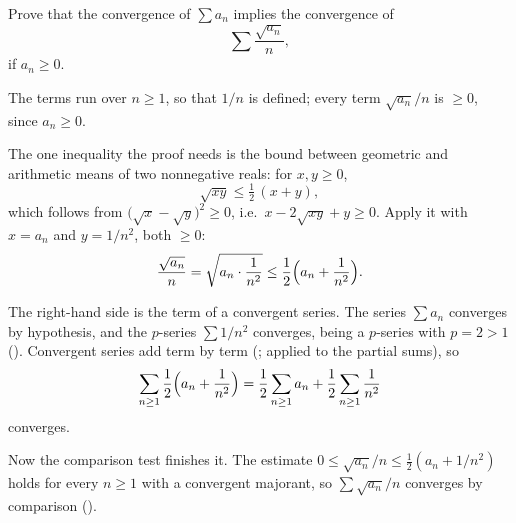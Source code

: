 \documentclass[main.tex]{subfiles}
\begin{document}
Prove that the convergence of $\sum a_{n}$ implies the convergence of
\[
\sum \frac{\sqrt{a_{n}}}{n},
\]
if $a_{n} \geq 0$.

\begin{SolutionBlue}
The terms run over $n\ge 1$, so that $1/n$ is defined; every term $\sqrt{a_n}/n$ is $\ge 0$, since
$a_n\ge 0$.

The one inequality the proof needs is the bound between geometric and arithmetic means of two
nonnegative reals: for $x,y\ge 0$,
\[
\sqrt{xy}\le\tfrac12\,(x+y),
\]
which follows from $\bigl(\sqrt{x}-\sqrt{y}\bigr)^2\ge 0$, i.e.\ $x-2\sqrt{xy}+y\ge 0$. Apply it with
$x=a_n$ and $y=1/n^2$, both $\ge 0$:
\[
\frac{\sqrt{a_n}}{n}=\sqrt{a_n\cdot\frac{1}{n^2}}\le\frac12\Bigl(a_n+\frac{1}{n^2}\Bigr).
\]

The right-hand side is the term of a convergent series. The series $\sum a_n$ converges by hypothesis,
and the $p$-series $\sum 1/n^2$ converges, being a $p$-series with $p=2>1$ (). Convergent
series add term by term (;  applied to the
partial sums), so
\[
\sum_{n\ge 1}\frac12\Bigl(a_n+\frac{1}{n^2}\Bigr)
=\frac12\sum_{n\ge 1}a_n+\frac12\sum_{n\ge 1}\frac{1}{n^2}
\]
converges.

Now the comparison test finishes it. The estimate
$0\le\sqrt{a_n}/n\le\tfrac12(a_n+1/n^2)$ holds for every $n\ge 1$ with a convergent majorant, so
$\sum\sqrt{a_n}/n$ converges by comparison ().
\end{SolutionBlue}
\end{document}
